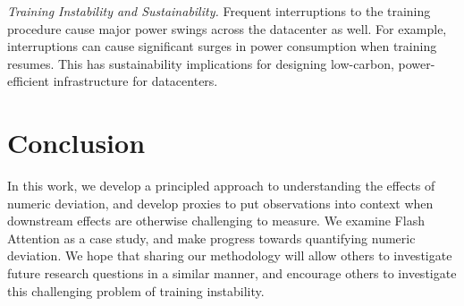 \textit{Training Instability and Sustainability.} Frequent interruptions to the training procedure cause major power swings across the datacenter as well. For example, interruptions can cause significant surges in power consumption when training resumes. This has sustainability implications for designing low-carbon, power-efficient infrastructure for datacenters. 

\section{Conclusion}
In this work, we develop a principled approach to understanding the effects of numeric deviation, and develop proxies to put observations into context when downstream effects are otherwise challenging to measure. We examine Flash Attention as a case study, and make progress towards quantifying numeric deviation. We hope that sharing our methodology will allow others to investigate future research questions in a similar manner, and encourage others to investigate this challenging problem of training instability.

\ifCLASSOPTIONcaptionsoff

\fi


